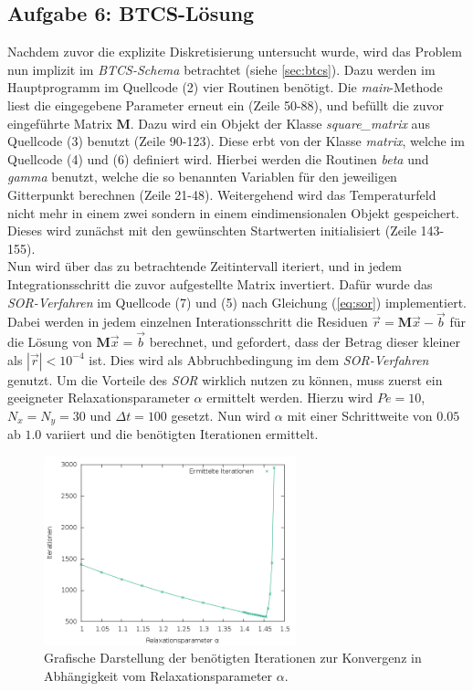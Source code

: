 \documentclass[12pt,a4paper,titlepage,headinclude,bibtotoc]{scrartcl}
\begin{document}
\subsection{Aufgabe 6: BTCS-Lösung}
\label{sec:task6}
Nachdem zuvor die explizite Diskretisierung untersucht wurde, wird das Problem nun implizit im \textit{BTCS-Schema} betrachtet (siehe \ref{sec:btcs}). Dazu werden im Hauptprogramm im Quellcode (2) vier Routinen benötigt.
Die \textit{main}-Methode liest die eingegebene Parameter erneut ein (Zeile 50-88), und befüllt die zuvor eingeführte Matrix $\textbf{M}$. Dazu wird ein Objekt der Klasse \textit{square\_matrix} aus Quellcode (3) benutzt (Zeile 90-123). Diese erbt von der Klasse \textit{matrix}, welche im Quellcode (4) und (6) definiert wird. Hierbei werden die Routinen \textit{beta} und \textit{gamma} benutzt, welche die so benannten Variablen für den jeweiligen Gitterpunkt berechnen (Zeile 21-48). Weitergehend wird das Temperaturfeld nicht mehr in einem zwei sondern in einem eindimensionalen Objekt gespeichert. Dieses wird zunächst mit den gewünschten Startwerten initialisiert (Zeile 143-155).\\
Nun wird über das zu betrachtende Zeitintervall iteriert, und in jedem Integrationsschritt die zuvor aufgestellte Matrix invertiert. Dafür wurde das \textit{SOR-Verfahren} im Quellcode (7) und (5) nach Gleichung (\ref{eq:sor}) implementiert. Dabei werden in jedem einzelnen Interationsschritt die Residuen $\vec{r} = \textbf{M} \vec{x}-\vec{b}$ für die Lösung von $\textbf{M} \vec{x} = \vec{b}$ berechnet, und gefordert, dass der Betrag dieser kleiner als $|\vec{r}| < 10^{-4}$ ist. Dies wird als Abbruchbedingung im dem \textit{SOR-Verfahren} genutzt. Um die Vorteile des \textit{SOR} wirklich nutzen zu können, muss zuerst ein geeigneter Relaxationsparameter $\alpha$ ermittelt werden. Hierzu wird $Pe=10$, $N_x=N_y = 30$ und $\Delta t=100$ gesetzt. Nun wird $\alpha$ mit einer Schrittweite von $0.05$ ab $1.0$ variiert und die benötigten Iterationen ermittelt. 
\begin{figure}[H]
 \centering
   \includegraphics[width=0.65\textwidth]{res/task6/sor_parameter.png}
   \caption{Grafische Darstellung der benötigten Iterationen zur Konvergenz in Abhängigkeit vom Relaxationsparameter $\alpha$.}
 \label{fig:task6_param_comp}
\end{figure}
\end{document}
